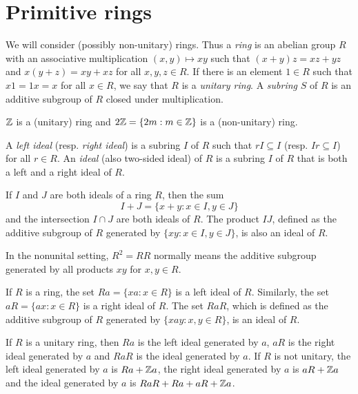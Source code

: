\section{Primitive rings}
\label{Primitive rings}

We will consider (possibly non-unitary) rings. Thus  a \emph{ring} is an
abelian group $R$ with an associative multiplication $(x,y)\mapsto xy$ such
that $(x+y)z=xz+yz$ and $x(y+z)=xy+xz$ for all $x,y,z\in R$. If there is an
element $1\in R$ such that $x1=1x=x$ for all $x\in R$, we say that $R$ is a
\emph{unitary ring}.  A \emph{subring} $S$ of $R$ is an additive subgroup of
$R$ closed under multiplication. 

\begin{example}
    $\mathbb{Z}$ is a (unitary) ring and 
	$2\mathbb{Z}=\{2m:m\in\mathbb{Z}\}$ is a (non-unitary) ring.  
\end{example}

A \emph{left ideal} (resp. \emph{right ideal}) is a subring $I$ of $R$ such that 
$rI\subseteq I$ (resp. $Ir\subseteq I$) for all $r\in R$. An \emph{ideal}
(also two-sided ideal) of $R$ is a subring $I$ of $R$ that is both a left and a right ideal of $R$.

\begin{example}
	If $I$ and $J$ are both ideals of a ring $R$, then the sum 
 \[
 I+J=\{x+y:x\in I,y\in J\}
 \]
 and the intersection $I\cap J$ are both ideals of $R$. The product $IJ$,
 defined as the additive subgroup of $R$ generated by $\{xy:x\in I,y\in J\}$,
 is also an ideal of $R$. 
\end{example}

In the nonunital setting, $R^2=RR$ normally means the additive subgroup
generated by all products $xy$ for $x,y\in R$. 

\begin{example}
	If $R$ is a ring, the set $Ra =\{xa: x\in R\}$ is a left ideal
	of $R$. Similarly, the set $aR =\{ax: x\in R\}$ is a right ideal of $R$. The set $RaR$, which is
	defined as the additive subgroup of $R$ generated by $\{xay: x, y\in R\}$, is an 
	ideal of $R$.
\end{example}

\begin{example}
	If $R$ is a unitary ring, then $Ra$ is the left ideal generated by $a$, $aR$ is
	the right ideal generated by $a$ and $RaR$ is the ideal generated by $a$. 
	If $R$ is not unitary, the left ideal generated by $a$ is $Ra+\mathbb{Z} a$,
	the right ideal generated by $a$ is $aR+\mathbb{Z} a$ and the ideal generated by 
	$a$ is $RaR+Ra+aR+\mathbb{Z} a$.
\end{example}

